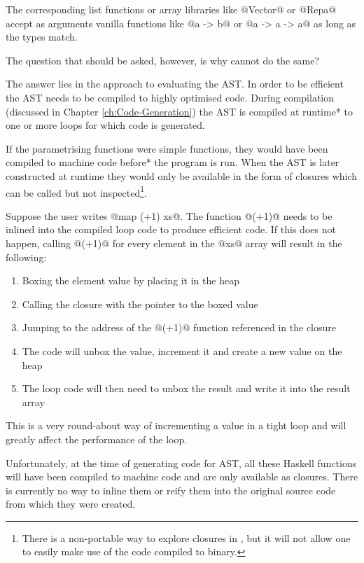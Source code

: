 \documentclass[preamble.tex]{subfiles}
\begin{document}
The corresponding \Haskell list functions or array libraries like @Vector@ or @Repa@ \cite{KCL+10} accept as arguments vanilla \Haskell functions like @a -> b@ or @a -> a -> a@ as long as the types match.

The question that should be asked, however, is why cannot \LiveFusion do the same?

The answer lies in the approach to evaluating the AST. In order to be efficient the AST needs to be compiled to highly optimised code. During compilation (discussed in Chapter \ref{ch:Code-Generation}) the AST is compiled \*at runtime* to one or more loops for which \Haskell code is generated.

If the parametrising functions were simple \Haskell functions, they would have been compiled to machine code \*before* the program is run. When the AST is later constructed at runtime they would only be available in the form of closures which can be called but not inspected\footnote{There is a non-portable way to explore closures in \Haskell, but it will not allow one to easily make use of the code compiled to binary.}.

Suppose the user writes @map (+1) xs@. The function @(+1)@ needs to be inlined into the compiled loop code to produce efficient code. If this does not happen, calling @(+1)@ for every element in the @xs@ array will result in the following:

\begin{enumerate}
\halfspacing
\item Boxing the element value by placing it in the heap
\item Calling the closure with the pointer to the boxed value
\item Jumping to the address of the @(+1)@ function referenced in the closure
\item The code will unbox the value, increment it and create a new value on the heap
\item The loop code will then need to unbox the result and write it into the result array
\end{enumerate}

This is a very round-about way of incrementing a value in a tight loop and will greatly affect the performance of the loop.

Unfortunately, at the time of generating code for AST, all these Haskell functions will have been compiled to machine code and are only available as closures. There is currently no way to inline them or reify them into the original \Haskell source code from which they were created.
\end{document}
